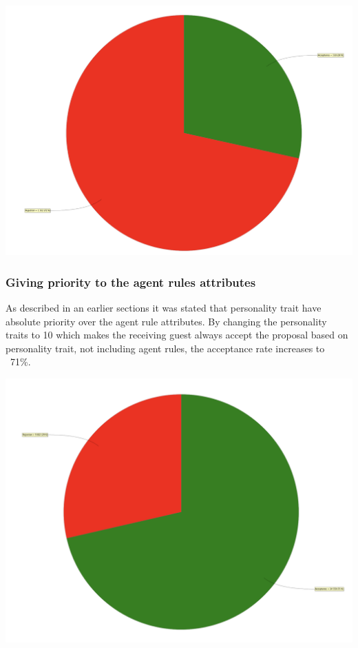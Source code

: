 \documentclass[a4paper,10pt]{article}
\begin{document}
\begin{center}{}
\centering\includegraphics[scale=0.05]{notimelimit.png}\par
\end{center}

\subsubsection{Giving priority to the agent rules attributes}
As described in an earlier sections it was stated that personality trait have absolute priority over the agent rule attributes. By changing the personality traits to 10 which makes the receiving guest always accept the proposal based on personality trait, not including agent rules, the acceptance rate increases to ~71\%.

\begin{center}{}
\centering\includegraphics[scale=0.05]{priority.png}\par
\end{center}
\end{document}
